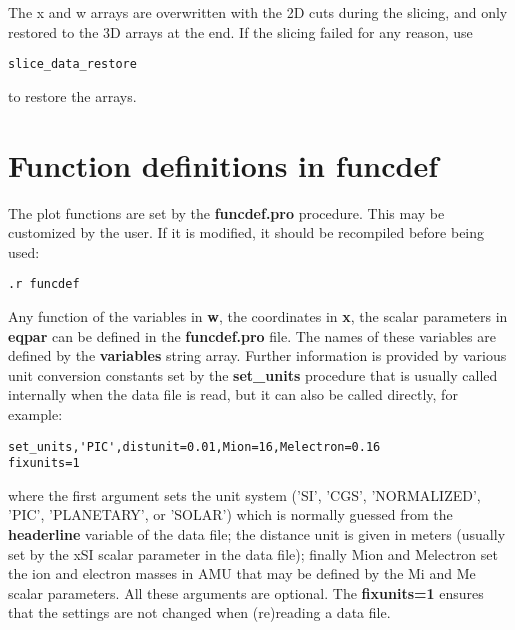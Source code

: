 \documentclass{article}
\begin{document}
   The x and w arrays are overwritten with the 2D cuts during the slicing,
   and only restored to the 3D arrays at the end.
   If the slicing failed for any reason, use
\begin{verbatim}
slice_data_restore
\end{verbatim}
   to restore the arrays.

\section{Function definitions in funcdef \label{s-funcdef}}

   The plot functions are set by the {\bf funcdef.pro} procedure.
   This may be customized by the user. If it is modified, 
   it should be recompiled before being used:
\begin{verbatim}
.r funcdef
\end{verbatim}
   Any function of the variables in {\bf w}, the coordinates in
   {\bf x}, the scalar parameters in {\bf eqpar} can be defined in the 
   {\bf funcdef.pro} file. The names of these variables are defined
   by the {\bf variables} string array.
   Further information is provided by various
   unit conversion constants set by the {\bf set\_units} procedure that
   is usually called internally when the data file is read, 
   but it can also be called directly, for example:
\begin{verbatim}
set_units,'PIC',distunit=0.01,Mion=16,Melectron=0.16
fixunits=1
\end{verbatim}
   where the first argument sets the unit system
   ('SI', 'CGS', 'NORMALIZED', 'PIC', 'PLANETARY', or 'SOLAR')
   which is normally guessed from the {\bf headerline} variable
   of the data file;
   the distance unit is given in meters (usually set by the xSI
   scalar parameter in the data file); finally 
   Mion and Melectron set the ion and electron masses in AMU
   that may be defined by the Mi and Me scalar parameters.
   All these arguments are optional.
   The {\bf fixunits=1} ensures that the settings are not changed
   when (re)reading a data file.
\end{document}
